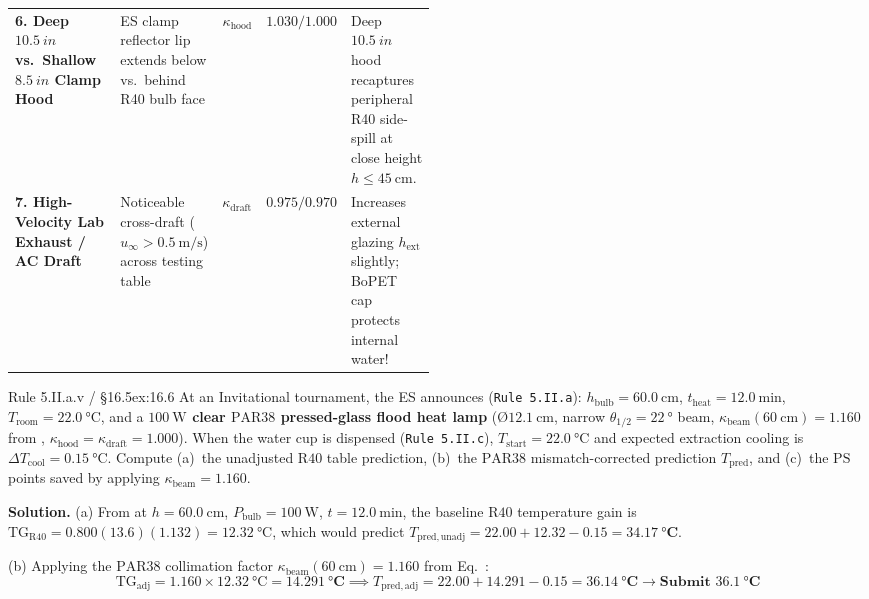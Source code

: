 \begin{center}
\begin{tabularx}{\linewidth}{@{}>{\raggedright\arraybackslash}p{0.25\linewidth}>{\raggedright\arraybackslash}p{0.24\linewidth}rr>{\raggedright\arraybackslash}X@{}}
\rowcolor{rowalt}\textbf{6. Deep $\SI{10.5}{in}$ vs.\ Shallow $\SI{8.5}{in}$ Clamp Hood} & ES clamp reflector lip extends below vs.\ behind R40 bulb face & $\kappa_{\mathrm{hood}}$ & $\mathbf{1.030 / 1.000}$ & Deep $\SI{10.5}{in}$ hood recaptures peripheral R40 side-spill at close height $h\le\SI{45}{\centi\meter}$. \\
\textbf{7. High-Velocity Lab Exhaust / AC Draft} & Noticeable cross-draft ($u_\infty > \SI{0.5}{\meter\per\second}$) across testing table & $\kappa_{\mathrm{draft}}$ & $\mathbf{0.975 / 0.970}$ & Increases external glazing $h_{\mathrm{ext}}$ slightly; BoPET cap protects internal water! \\
\bottomrule
\end{tabularx}
\end{center}

\begin{workedexample}{Rule 5.II.a.v / §16.5}{ex:16.6}
At an Invitational tournament, the ES announces (\texttt{Rule 5.II.a}): $h_{\mathrm{bulb}} = \SI{60.0}{\centi\meter}$, $t_{\mathrm{heat}} = \SI{12.0}{\minute}$, $T_{\mathrm{room}} = \SI{22.0}{\celsius}$, and a \textbf{$\SI{100}{\watt}$ clear $\mathrm{PAR38}$ pressed-glass flood heat lamp} ($\text{\O}\SI{12.1}{\centi\meter}$, narrow $\theta_{1/2}=\SI{22}{\degree}$ beam, $\kappa_{\mathrm{beam}}(\SI{60}{\centi\meter}) = 1.160$ from , $\kappa_{\mathrm{hood}} = \kappa_{\mathrm{draft}} = 1.000$). When the water cup is dispensed (\texttt{Rule 5.II.c}), $T_{\mathrm{start}} = \SI{22.0}{\celsius}$ and expected extraction cooling is $\Delta T_{\mathrm{cool}} = \SI{0.15}{\celsius}$. Compute (a)~the unadjusted $\mathrm{R40}$ table prediction, (b)~the $\mathrm{PAR38}$ mismatch-corrected prediction $T_{\mathrm{pred}}$, and (c)~the $\mathrm{PS}$ points saved by applying $\kappa_{\mathrm{beam}} = 1.160$.

\textbf{Solution.}
(a) From  at $h = \SI{60.0}{\centi\meter}$, $P_{\mathrm{bulb}} = \SI{100}{\watt}$, $t = \SI{12.0}{\minute}$, the baseline $\mathrm{R40}$ temperature gain is $\mathrm{TG}_{\mathrm{R40}} = 0.800(13.6)(1.132) = \SI{12.32}{\celsius}$, which would predict $T_{\mathrm{pred,unadj}} = 22.00 + 12.32 - 0.15 = \mathbf{\SI{34.17}{\celsius}}$.

(b) Applying the $\mathrm{PAR38}$ collimation factor $\kappa_{\mathrm{beam}}(\SI{60}{\centi\meter}) = 1.160$ from Eq.~:
\[
  \mathrm{TG}_{\mathrm{adj}} = 1.160 \times \SI{12.32}{\celsius} = \mathbf{\SI{14.291}{\celsius}} \implies T_{\mathrm{pred,adj}} = 22.00 + 14.291 - 0.15 = \mathbf{\SI{36.14}{\celsius} \longrightarrow \text{Submit }\SI{36.1}{\celsius}}
\]


\end{workedexample}
